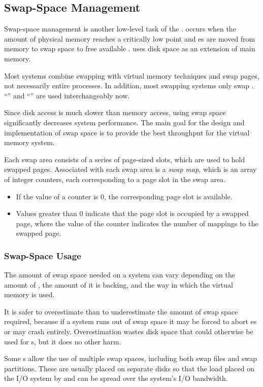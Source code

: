 \subsection{Swap-Space Management}\label{subsec:Swap_Space_Management}
Swap-space management is another low-level task of the .
 occurs when the amount of physical memory reaches a critically low point and es are moved from memory to swap space to free available .
 uses disk space as an extension of main memory.

Most systems combine swapping with virtual memory techniques and swap pages, not necessarily entire processes.
In addition, most swapping systems only swap .
``'' and ``'' are used interchangeably now.

Since disk access is much slower than memory access, using swap space significantly decreases system performance.
The main goal for the design and implementation of swap space is to provide the best throughput for the virtual memory system.

Each swap area consists of a series of page-sized slots, which are used to hold swapped pages.
Associated with each swap area is a \emph{swap map}, which is an array of integer counters, each corresponding to a page slot in the swap area.
\begin{itemize}[noitemsep]
\item If the value of a counter is 0, the corresponding page slot is available.
\item Values greater than 0 indicate that the page slot is occupied by a swapped page, where the value of the counter indicates the number of mappings to the swapped page.
\end{itemize}

\subsubsection{Swap-Space Usage}\label{subsubsec:Swap_Space_Usage}
The amount of swap space needed on a system can vary depending on the amount of , the amount of  it is backing, and the way in which the virtual memory is used.

It is safer to overestimate than to underestimate the amount of swap space required, because if a system runs out of swap space it may be forced to abort es or may crash entirely.
Overestimation wastes disk space that could otherwise be used for s, but it does no other harm.

Some s allow the use of multiple swap spaces, including both swap files and swap partitions.
These are usually placed on separate disks so that the load placed on the I/O system by  and  can be spread over the system’s I/O bandwidth.



